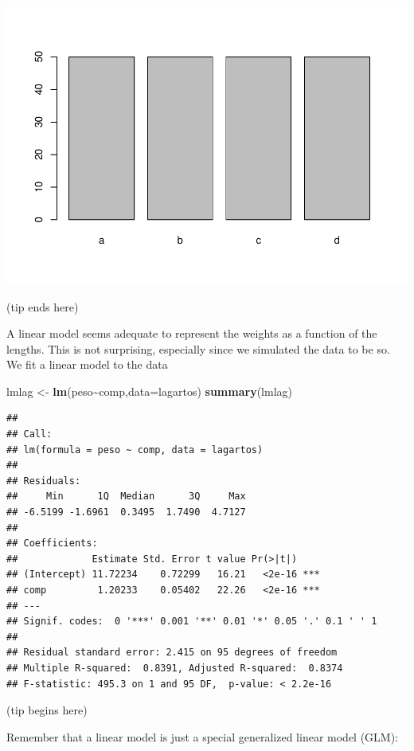 \documentclass[
]{book}
\newenvironment{Shaded}{\begin{snugshade}}{\end{snugshade}}
\newcommand{\AttributeTok}[1]{\textcolor[rgb]{0.13,0.29,0.53}{#1}}
\newcommand{\FunctionTok}[1]{\textcolor[rgb]{0.13,0.29,0.53}{\textbf{#1}}}
\newcommand{\NormalTok}[1]{#1}
\newcommand{\OtherTok}[1]{\textcolor[rgb]{0.56,0.35,0.01}{#1}}
\newcommand{\SpecialCharTok}[1]{\textcolor[rgb]{0.81,0.36,0.00}{\textbf{#1}}}
\begin{document}
\includegraphics{ECOMODbook_files/figure-latex/unnamed-chunk-1-1.pdf}

(tip ends here)

A linear model seems adequate to represent the weights as a function of the lengths. This is not surprising, especially since we simulated the data to be so. We fit a linear model to the data

\begin{Shaded}
\begin{Highlighting}[]
\NormalTok{lmlag }\OtherTok{\textless{}{-}} \FunctionTok{lm}\NormalTok{(peso}\SpecialCharTok{\textasciitilde{}}\NormalTok{comp,}\AttributeTok{data=}\NormalTok{lagartos)}
\FunctionTok{summary}\NormalTok{(lmlag)}
\end{Highlighting}
\end{Shaded}

\begin{verbatim}
## 
## Call:
## lm(formula = peso ~ comp, data = lagartos)
## 
## Residuals:
##     Min      1Q  Median      3Q     Max 
## -6.5199 -1.6961  0.3495  1.7490  4.7127 
## 
## Coefficients:
##             Estimate Std. Error t value Pr(>|t|)    
## (Intercept) 11.72234    0.72299   16.21   <2e-16 ***
## comp         1.20233    0.05402   22.26   <2e-16 ***
## ---
## Signif. codes:  0 '***' 0.001 '**' 0.01 '*' 0.05 '.' 0.1 ' ' 1
## 
## Residual standard error: 2.415 on 95 degrees of freedom
## Multiple R-squared:  0.8391, Adjusted R-squared:  0.8374 
## F-statistic: 495.3 on 1 and 95 DF,  p-value: < 2.2e-16
\end{verbatim}

(tip begins here)

Remember that a linear model is just a special generalized linear model (GLM):
\end{document}
